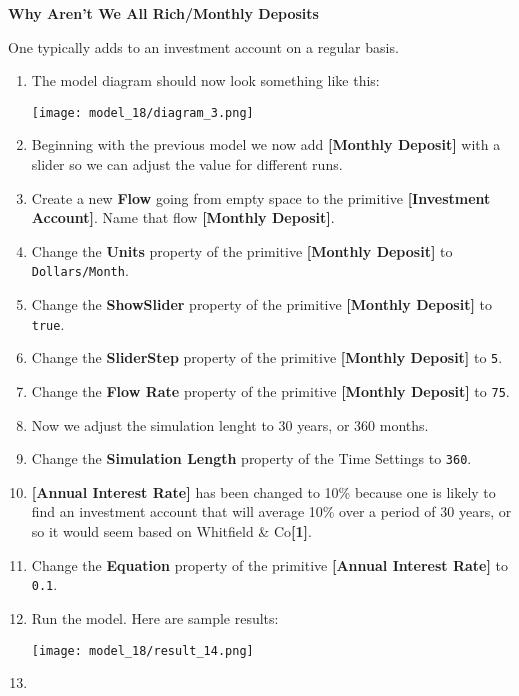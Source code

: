 \documentclass[]{memoir}
\makeatletter
\def\maxwidth{\ifdim\Gin@nat@width>\linewidth\linewidth
\else\Gin@nat@width\fi}
\let\Oldincludegraphics\includegraphics
\renewcommand{\includegraphics}[1]{\Oldincludegraphics[width=\maxwidth]{#1}}
\newcommand{\p}[1]{\textbf{{[}#1{]}}}
\newcommand{\e}[1]{\texttt{#1}}
\renewcommand{\a}[1]{\textbf{#1}}
\makeatother
\begin{document}
\begin{oframed}\textbf{Why Aren't We All Rich/Monthly Deposits} 

 One typically adds to an investment account on a regular basis.

\begin{enumerate}
\item The model diagram should now look something like this: \par \begin{minipage}{\linewidth}  \centering \texttt{[image: model\_18/diagram\_3.png]}
\end{minipage}
\item 

Beginning with the previous model we now add \p{Monthly Deposit} with a slider so we can adjust the value for different runs.


\item Create a new \a{Flow} going from empty space to the primitive \p{Investment Account}. Name that flow \p{Monthly Deposit}.
\item  Change the \a{Units} property of the primitive \p{Monthly Deposit} to \e{Dollars/Month}.
\item  Change the \a{ShowSlider} property of the primitive \p{Monthly Deposit} to \e{true}.
\item  Change the \a{SliderStep} property of the primitive \p{Monthly Deposit} to \e{5}.
\item  Change the \a{Flow Rate} property of the primitive \p{Monthly Deposit} to \e{75}.
\item 

Now we adjust the simulation lenght to 30 years, or 360 months.


\item  Change the \a{Simulation Length} property of the Time Settings to \e{360}.
\item 

\p{Annual Interest Rate} has been changed to 10\% because one is likely to find an investment account that will average 10\% over a period of 30 years, or so it would seem based on Whitfield \& Co\p{1}.


\item  Change the \a{Equation} property of the primitive \p{Annual Interest Rate} to \e{0.1}.
\item Run the model. Here are sample results:\par \begin{minipage}{\linewidth}  \centering \texttt{[image: model\_18/result\_14.png]}
\end{minipage}
\item 


\end{enumerate}
\end{oframed}
\end{document}
